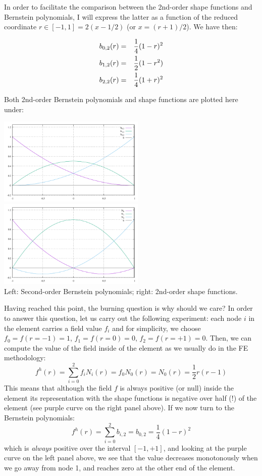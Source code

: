 In order to facilitate the comparison between the 2nd-order shape functions and Bernstein 
polynomials, I will express the latter as a function of the reduced coordinate
$r\in[-1,1]=2(x-1/2)$ (or $x=(r+1)/2$). We have then:

\begin{eqnarray}
b_{0,2}(r) &=& \frac{1}{4}(1-r)^2 \nonumber\\
b_{1,2}(r) &=& \frac{1}{2}(1-r^2) \nonumber\\
b_{2,2}(r) &=& \frac{1}{4}(1+r)^2
\end{eqnarray}

Both 2nd-order Bernstein polynomials and shape functions are plotted here under:
\begin{center}
\includegraphics[width=7cm]{images/bernstein/b2_.pdf}
\includegraphics[width=7cm]{images/bernstein/N2_.pdf}\\
{\captionfont Left: Second-order Bernstein polynomials; right: 2nd-order shape functions.}
\end{center}

Having reached this point, the burning question is why should we care? 
In order to answer this question, let us carry out the following 
experiment: each node $i$ in the element carries a field value $f_i$ and for simplicity, 
we choose $f_0=f(r=-1)=1$, $f_1=f(r=0)=0$, $f_2=f(r=+1)=0$.
Then, we can compute the value of the field inside of the element 
as we usually do in the FE methodology:
\[
f^h(r) = \sum_{i=0}^2 f_i N_i(r) = f_0 N_0(r) = N_0(r) = \frac{1}{2}r(r-1)
\]
This means that although the field $f$ is always positive (or null) inside the element
its representation with the shape functions is negative over half (!) of the element
(see purple curve on the right panel above).
If we now turn to the Bernstein polynomials:
\[
f^h(r) = \sum_{i=0}^2 b_{i,2} = b_{0,2} = \frac{1}{4}(1-r)^2
\]
which is {\it always} positive over the interval $[-1,+1]$, 
and looking at the purple curve on the left panel above, 
we see that the value decreases monotonously when we go away from node 1, and reaches 
zero at the other end of the element. 

